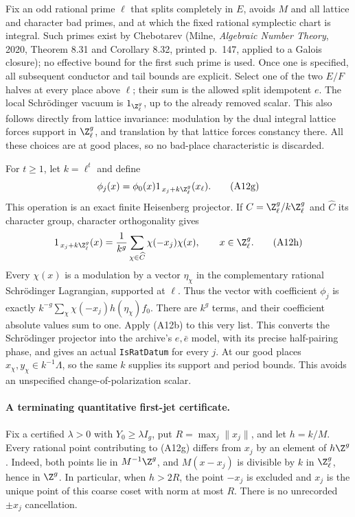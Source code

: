 \documentclass[11pt]{article}
\theoremstyle{definition}\newtheorem{definition}[theorem]{Definition}\newtheorem{remark}[theorem]{Remark}
\begin{document}
Fix an odd rational prime $\ell$ that splits completely in
$E$, avoids $M$ and all lattice and character bad primes,
and at which the fixed rational symplectic chart is integral.
Such primes exist by Chebotarev (Milne, \emph{Algebraic
Number Theory}, 2020, Theorem 8.31 and Corollary 8.32,
printed p.~147, applied to a Galois closure); no effective bound for the
first such prime is used.  Once one is specified, all
subsequent conductor and tail bounds are explicit.  Select
one of the two $E/F$ halves at every place above $\ell$;
their sum is the allowed split idempotent $e$.  The local
Schr\"odinger vacuum is $1_{\Z_\ell^g}$, up to the already
removed scalar.  This also follows directly from lattice
invariance: modulation by the dual integral lattice forces
support in $\Z_\ell^g$, and translation by that lattice
forces constancy there.  All these choices are at good
places, so no bad-place characteristic is discarded.

For $t\geq1$, let $k=\ell^t$ and define
\[
 \phi_j(x)=\phi_0(x)
           1_{\,x_j+k\Z_\ell^g}(x_\ell).
 \tag{A12g}
\]
This operation is an exact finite Heisenberg projector.
If $C=\Z_\ell^g/k\Z_\ell^g$ and $\widehat C$ its
character group, character orthogonality gives
\[
 1_{\,x_j+k\Z_\ell^g}(x)
       =\frac1{k^g}\sum_{\chi\in\widehat C}
                         \chi(-x_j)\chi(x),
                         \qquad x\in\Z_\ell^g.
 \tag{A12h}
\]
Every $\chi(x)$ is a modulation by a vector $\eta_\chi$
in the complementary rational Schr\"odinger Lagrangian,
supported at $\ell$.  Thus the vector with coefficient
$\phi_j$ is exactly
$k^{-g}\sum_\chi\chi(-x_j)h(\eta_\chi)f_0$.
There are $k^g$ terms, and their coefficient absolute
values sum to one.  Apply (A12b) to this very list.
This converts the Schr\"odinger projector into the
archive's $e,\bar e$ model, with its precise half-pairing
phase, and gives an actual \texttt{IsRatDatum} for every
$j$.  At our good places $x_\chi,y_\chi\in k^{-1}\Lambda$,
so the same $k$ supplies its support and period bounds.
This avoids an unspecified change-of-polarization scalar.

\paragraph{A terminating quantitative first-jet certificate.}
Fix a certified $\lambda>0$ with $Y_0\geq\lambda I_g$,
put $R=\max_j\|x_j\|$, and let $h=k/M$.
Every rational point contributing to (A12g) differs from
$x_j$ by an element of $h\Z^g$.  Indeed, both points
lie in $M^{-1}\Z^g$, and $M(x-x_j)$ is divisible by
$k$ in $\Z_\ell^g$, hence in $\Z^g$.  In particular,
when $h>2R$, the point $-x_j$ is excluded and $x_j$
is the unique point of this coarse coset with norm at
most $R$.  There is no unrecorded $\pm x_j$ cancellation.
\end{document}
